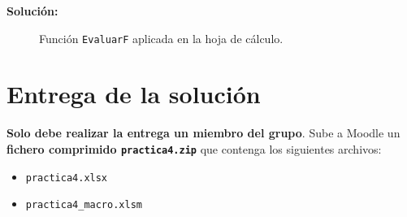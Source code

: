\documentclass[
  spanish,
  11pt,
  a4paper,
  DIV=11,
  numbers=noendperiod]{scrartcl}
\providecommand{\tightlist}{\setlength{\itemsep}{0pt}\setlength{\parskip}{0pt}}
\begin{document}
\vspace{0.7em}
\textbf{Solución:}

\begin{figure}[H]
\caption{Función \texttt{EvaluarF} aplicada en la hoja de cálculo.}\label{fig-resultado-evaluarf}
\end{figure}

\section{Entrega de la solución}
\label{entrega-de-la-solucion}

\textbf{Solo debe realizar la entrega un miembro del grupo}. Sube a Moodle un \textbf{fichero comprimido \texttt{practica4.zip}} que contenga los siguientes archivos:

\begin{itemize}
\tightlist
\item \texttt{practica4.xlsx}
\item \texttt{practica4\_macro.xlsm}
\end{itemize}
\end{document}
